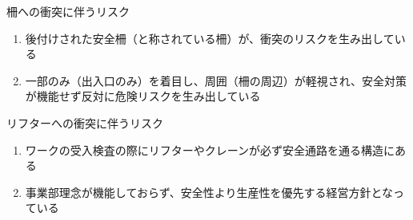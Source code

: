 \begin{Issues}{柵への衝突に伴うリスク}
\begin{enumerate}[label=\sarrow]
\item 後付けされた安全柵（と称されている柵）が、衝突のリスクを生み出している
\item 一部のみ（出入口のみ）を着目し、周囲（柵の周辺）が軽視され、安全対策が機能せず反対に危険リスクを生み出している
\end{enumerate}
\end{Issues}
\begin{Issues}{リフターへの衝突に伴うリスク}
\begin{enumerate}[label=\sarrow]
\item ワークの受入検査の際にリフターやクレーンが必ず安全通路を通る構造にある
\item {}事業部理念が機能しておらず、安全性より生産性を優先する経営方針となっている
\end{enumerate}
\end{Issues}


\clearpage


